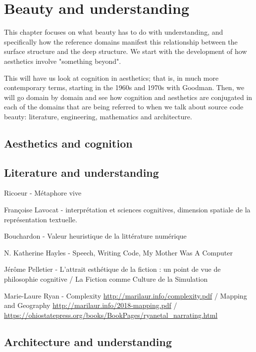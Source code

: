 \chapter{Beauty and understanding}
\label{chap:beauty}

This chapter focuses on what beauty has to do with understanding, and specifically how the reference domains manifest this relationship between the surface structure and the deep structure. We start with the development of how aesthetics involve "something beyond".

This will have us look at cognition in aesthetics; that is, in much more contemporary terms, starting in the 1960s and 1970s with Goodman. Then, we will go domain by domain and see how cognition and aesthetics are conjugated in each of the domains that are being referred to when we talk about source code beauty: literature, engineering, mathematics and architecture.


\section{Aesthetics and cognition}
\label{sec:aesthetic_cognition}

\section{Literature and understanding}
\label{sec:aesthetic-literature}

Ricoeur - Métaphore vive

Françoise Lavocat - interprétation et sciences cognitives, dimension spatiale de la représentation textuelle.

Bouchardon - Valeur heuristique de la littérature numérique

N. Katherine Hayles - Speech, Writing Code, My Mother Was A Computer

Jérôme Pelletier -  L'attrait esthétique de la fiction : un point de vue de philosophie cognitive /  La Fiction comme Culture de la Simulation 

Marie-Laure Ryan - Complexity \url{http://marilaur.info/complexity.pdf} / Mapping and Geography \url{http://marilaur.info/2018-mapping.pdf} / \url{https://ohiostatepress.org/books/BookPages/ryanetal_narrating.html}

\section{Architecture and understanding}
\label{sec:arch_understanding}

